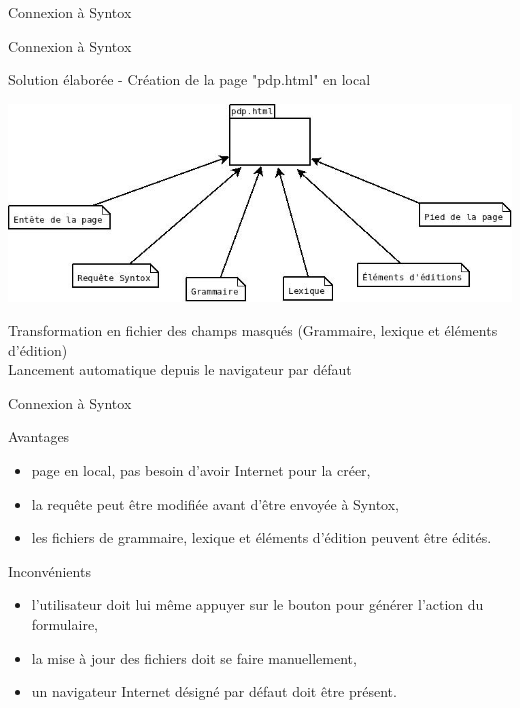 \documentclass[11pt]{beamer}
\begin{document}
\begin{frame}{Connexion à Syntox}

\begin{itemize}
\end{itemize}
\end{frame}

\begin{frame}{Connexion à Syntox}
\begin{block}{Solution élaborée - Création de la page "pdp.html" en local}

\begin{center}
\includegraphics[scale=0.3]{syntox_connection2.png}
\end{center}
Transformation en fichier des champs masqués (Grammaire, lexique et éléments d'édition)
\\ Lancement automatique depuis le navigateur par défaut
\end{block}
\end{frame}

\begin{frame}{Connexion à Syntox}
\begin{block}{Avantages}
\begin{itemize}
\item page en local, pas besoin d'avoir Internet pour la créer,
\item la requête peut être modifiée avant d'être envoyée à Syntox,
\item les fichiers de grammaire, lexique et éléments d'édition peuvent être édités.
\end{itemize}
\end{block}
\begin{block}{Inconvénients}
\begin{itemize}
\item l'utilisateur doit lui même appuyer sur le bouton pour générer l'action du formulaire,
\item la mise à jour des fichiers doit se faire manuellement,
\item un navigateur Internet désigné par défaut doit être présent.
\end{itemize}
\end{block}
\end{frame}
\end{document}
